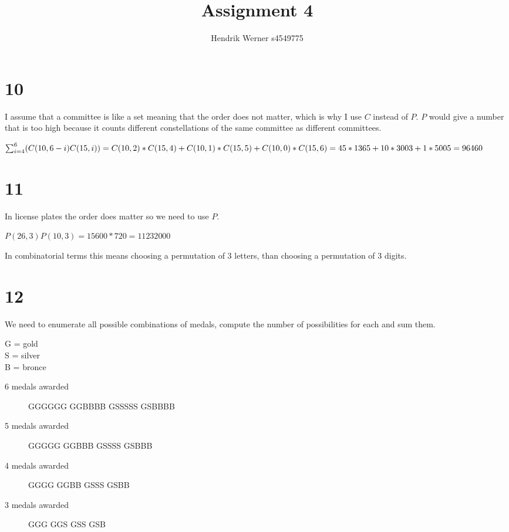 \documentclass[12pt]{article}
\title {Assignment 4}
\author {Hendrik Werner s4549775}
\begin{document}
\maketitle

\section*{10}
I assume that a committee is like a set meaning that the order does not matter, which is why I use $C$ instead of $P$. $P$ would give a number that is too high because it counts different constellations of the same committee as different committees.

$\sum_{i = 4}^{6}(C(10, 6 - i)C(15, i))\\
= C(10, 2) * C(15, 4) + C(10, 1) * C(15, 5) + C(10, 0) * C(15, 6)\\
= 45 * 1365 + 10 * 3003 + 1 * 5005 = 96460$

\section*{11}
In license plates the order does matter so we need to use $P$.

$P(26, 3)P(10, 3) = 15 600 * 720 = 11 232 000$

In combinatorial terms this means choosing a permutation of 3 letters, than choosing a permutation of 3 digits.

\section*{12}
We need to enumerate all possible combinations of medals, compute the number of possibilities for each and sum them.

G = gold\\
S = silver\\
B = bronce

\begin{description}
	\item[6 medals awarded]
	GGGGGG
	GGBBBB
	GSSSSS
	GSBBBB

	\item[5 medals awarded]
	GGGGG
	GGBBB
	GSSSS
	GSBBB

	\item[4 medals awarded]
	GGGG
	GGBB
	GSSS
	GSBB

	\item[3 medals awarded]
	GGG
	GGS
	GSS
	GSB
\end{description}
\end{document}
